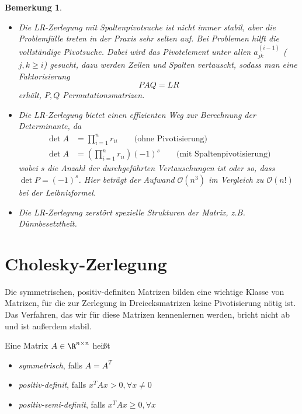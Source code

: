 \documentclass{mycourse}
\newtheorem{notee}[thm]{Bemerkung}
\begin{document}
\begin{notee}
	\label{note:3.11}
	\begin{itemize}
		\item
			Die LR-Zerlegung mit Spaltenpivotsuche ist nicht immer stabil, aber die Problemfälle treten in der Praxis sehr selten auf.
			Bei Problemen hilft die vollständige Pivotsuche.
			Dabei wird das Pivotelement unter allen $a_{jk}^{(i-1)}$ ($j,k\ge i$) gesucht, dazu werden Zeilen und Spalten vertauscht, sodass man eine Faktorisierung
			\[
				PAQ = LR
			\]
			erhält, $P,Q$ Permutationsmatrizen.
		\item
			Die LR-Zerlegung bietet einen effizienten Weg zur Berechnung der Determinante, da
			\begin{align*}
				\det A &= \prod_{i=1}^n r_{ii} \qquad \text{(ohne Pivotisierung)}\\
				\det A &= \left(\prod_{i=1}^n r_{ii}\right) (-1)^s \qquad \text{(mit Spaltenpivotisierung)}
			\end{align*}
			wobei $s$ die Anzahl der durchgeführten Vertauschungen ist oder so, dass $\det P = (-1)^s$.
			Hier beträgt der Aufwand $\mathcal O(n^3)$ im Vergleich zu $\mathcal O(n!)$ bei der Leibnizformel.
		\item
			Die LR-Zerlegung zerstört spezielle Strukturen der Matrix, z.B. Dünnbesetztheit.
	\end{itemize}
\end{notee}

\section{Cholesky-Zerlegung}

Die symmetrischen, positiv-definiten Matrizen bilden eine wichtige Klasse von Matrizen, für die zur Zerlegung in Dreiecksmatrizen keine Pivotisierung nötig ist.
Das Verfahren, das wir für diese Matrizen kennenlernen werden, bricht nicht ab und ist außerdem stabil.

\begin{df}
	\label{df:3.12}
	Eine Matrix $A\in \R^{n\times n}$ heißt
	\begin{itemize}
		\item \emph{symmetrisch}, falls $A = A^T$
		\item \emph{positiv-definit}, falls $x^TAx > 0, \forall x\neq 0$
		\item \emph{positiv-semi-definit}, falls $x^TAx \ge 0, \forall x$
	\end{itemize}	
\end{df}
\end{document}
